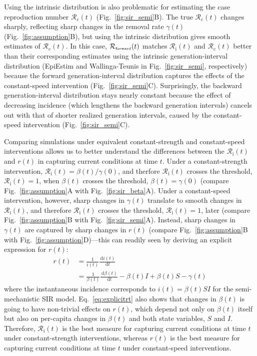 \documentclass[12pt]{article}
\newcommand{\eref}[1]{Eq.~\ref{eq:#1}}
\newcommand{\fref}[1]{Fig.~\ref{fig:#1}}
\newcommand{\Rx}[1]{\ensuremath{{\mathcal R}_{#1}}\xspace}
\newcommand{\Rc}{\Rx{\mathrm{c}}}
\newcommand{\Ri}{\Rx{\mathrm{i}}}
\newcommand{\RR}{\ensuremath{{\mathcal R}}\xspace}
\newcommand{\tsub}[2]{#1_{{\textrm{\tiny #2}}}}
\newcommand{\dd}[1]{\ensuremath{\, \mathrm{d}#1}}
\begin{document}
Using the intrinsic distribution is also problematic for estimating the case reproduction number $\Rc(t)$ (\fref{sir_semi}B).
The true $\Rc(t)$ changes sharply, reflecting sharp changes in the removal rate $\gamma(t)$ (\fref{assumption}B), but using the intrinsic distribution gives smooth estimates of $\Rc(t)$.
In this case, $\tsub{\RR}{forward}(t)$ matches $\Ri(t)$ and $\Rc(t)$ better than their corresponding estimates using the intrinsic generation-interval distribution (EpiEstim and Wallinga-Teunis in \fref{sir_semi}, respectively) because the forward generation-interval distribution captures the effects of the constant-speed intervention (\fref{sir_semi}C).
Surprisingly, the backward generation-interval distribution stays nearly constant because the effect of decreasing incidence (which lengthens the backward generation intervals) cancels out with that of shorter realized generation intervals, caused by the constant-speed intervention (\fref{sir_semi}C).

Comparing simulations under equivalent constant-strength and constant-speed interventions allows us to better understand the differences between the $\Ri(t)$ and $r(t)$ in capturing current conditions at time $t$.
Under a constant-strength intervention, $\Ri(t) = \beta(t)/\gamma(0)$, and therfore $\Ri(t)$ crosses the threshold, $\Ri(t) = 1$, when $\beta(t)$ crosses the threshold, $\beta(t) = \gamma(0)$ (compare \fref{assumption}A with \fref{sir_beta}A).
Under a constant-speed intervention, however, sharp changes in $\gamma(t)$ translate to smooth changes in $\Ri(t)$, and therefore $\Ri(t)$ crosses the threshold, $\Ri(t) = 1$, later (compare \fref{assumption}B with \fref{sir_semi}A).
Instead, sharp changes in $\gamma(t)$ are captured by sharp changes in $r(t)$ (compare \fref{assumption}B with \fref{assumption}D)---this can readily seen by deriving an explicit expression for $r(t)$:
\begin{align}
r(t) &=  \frac{1}{i(t)} \frac{\dd i(t)}{\dd t}\\
&= \frac{1}{\beta(t)} \frac{\dd \beta(t)}{\dd t} - \beta(t) I + \beta(t) S - \gamma(t) \label{eq:explicitrt}
\end{align}
where the instantaneous incidence corresponds to $i(t) = \beta(t) S I$ for the semi-mechanistic SIR model.
\eref{explicitrt} also shows that changes in $\beta(t)$ is going to have non-trivial effects on $r(t)$, which depend not only on $\beta(t)$ itself but also on per-capita changes in $\beta(t)$ and both state variables, $S$ and $I$.
Therefore, $\Ri(t)$ is the best measure for capturing current conditions at time $t$ under constant-strength interventions, whereas $r(t)$ is the best measure for capturing current conditions at time $t$ under constant-speed interventions. 
\end{document}
